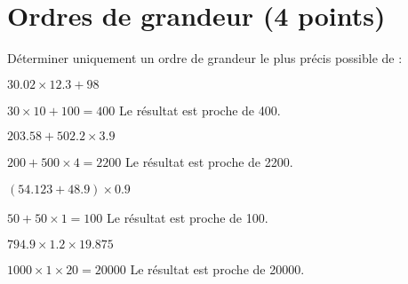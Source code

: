 \section{Ordres de grandeur (4 points)}

Déterminer uniquement un ordre de grandeur le plus précis possible de :

\begin{questions}
	\question[1] $\num{30.02} \times \num{12.3} + 98$
	\begin{solution}
		$\num{30}	\times 10 + 100 = 400	$
		Le résultat est proche de 400.
	\end{solution}
	\question[1] $\num{203.58} + \num{502.2} \times \num{3.9}$
	\begin{solution}
		$\num{200}	+ 500 \times 4 = 2200	$
		Le résultat est proche de 2200.
	\end{solution}
	\question[1] $(\num{54.123} + \num{48.9}) \times \num{0.9}$
	\begin{solution}
		$\num{50}	+ 50 \times 1 = 100	$
		Le résultat est proche de 100.
	\end{solution}

	\question[1] $\num{794.9} \times \num{1.2} \times \num{19.875}$
	\begin{solution}
		$\num{1000}	\times 1 \times 20 = \num{20000}	$
		Le résultat est proche de \num{20000}.
	\end{solution}
\end{questions}